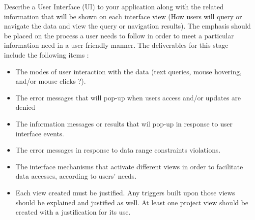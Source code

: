 \textnormal{
Describe a User Interface (UI) to your application along with the related information that will be shown on each interface view (How users will query or navigate the data and view the query or navigation results). The emphasis should be placed on the process a user needs to follow in order to meet a particular information need in a user-friendly manner.
The deliverables for this stage include the following items :
}
\begin{itemize} 
\item{The modes of user interaction with the data (text queries, mouse hovering, and/or mouse clicks ?).} 
\item{The error messages that will pop-up when users access and/or updates are denied   }
\item{The information messages or results that wil pop-up in response to user interface events. }
	
\item{ The error messages in response to data range constraints violations.}
	
\item{ The interface mechanisms that activate different views in order to facilitate data accesses, according to users'  needs. }
	
\item{Each view created must be justified. Any triggers built upon those views should be explained and justified as well. At least one project view should be created with a justification for its use. }	
\end{itemize}

